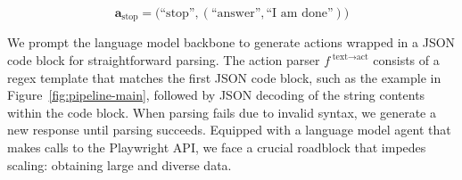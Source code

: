 \begin{equation}
    \mathbf{a}_{\text{stop}} = \big( \text{``stop''}, ( \text{``answer''}, \text{``I am done''} ) \big)
\end{equation}

We prompt the language model backbone to generate actions wrapped in a JSON code block for straightforward parsing. The action parser $f^{\;\text{text} \to \text{act}}$ consists of a regex template that matches the first JSON code block, such as the example in Figure~\ref{fig:pipeline-main}, followed by JSON decoding of the string contents within the code block. When parsing fails due to invalid syntax, we generate a new response until parsing succeeds. Equipped with a language model agent that makes calls to the Playwright API, we face a crucial roadblock that impedes scaling: obtaining large and diverse data. 